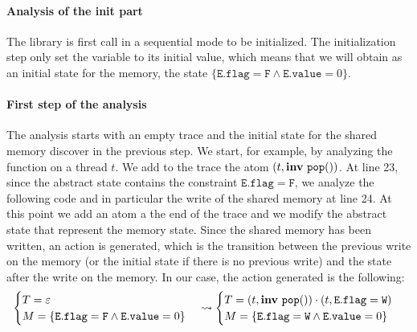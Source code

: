 \paragraph{Analysis of the init part} 

The library is first call in a sequential mode to be initialized. The initialization step only set the variable  to its initial value, which means that we will obtain as an initial state for the memory, the state $\{\mathtt{E.flag} = \mathtt{F} \wedge \mathtt{E.value} = 0\}$.


\paragraph{First step of the analysis}

The analysis starts with an empty trace and the initial state for the shared memory discover in the previous step. We start, for example, by analyzing the  function on a thread $t$. We add to the trace the atom $(t, \mathbf{inv}\ \mathtt{pop}())$. At line 23, since the abstract state contains the constraint $\mathtt{E.flag} = \mathtt{F}$, we analyze the following code and in particular the write of the shared memory at line 24. 
At this point we add an atom a the end of the trace and we modify the abstract state that represent the memory state. Since the shared memory has been written, an action is generated, which is the transition between the previous write on the memory (or the initial state if there is no previous write) and the state after the write on the memory. 
In our case, the action generated is the following:
\[\begin{cases}
	T = \varepsilon\\
	M = \{\mathtt{E.flag} = \mathtt{F} \wedge \mathtt{E.value} = 0\}
\end{cases} \leadsto
\begin{cases}
	T = (t, \mathbf{inv}\ \mathtt{pop}()) \cdot (t, \mathtt{E.flag} = \mathtt{W})\\
	M = \{\mathtt{E.flag} = \mathtt{W} \wedge \mathtt{E.value} = 0\}
\end{cases}\]


